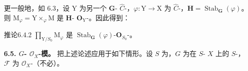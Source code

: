 更一般地，如 6.3，设 $\mathrm Y$ 为另一个 $\mathbf G$- $\widehat C$-，$\varphi:\mathrm Y\to\mathrm X$ 为 $\widehat C$-，$\mathbf H=\operatorname{Stab}_{\mathbf G}(\varphi)$。则 $\mathrm M_\varphi=\mathrm Y\times_\varphi\mathrm M$ 是 $\mathbf H$- $\mathbf O_{\mathrm Y}$-。因此得到：
\begin{SGAresult}{推论}{6.4.2}
 $\prod_{\mathrm Y/S_0}\mathrm M_\varphi$ 是 $\operatorname{Stab}_{\mathbf G}(\varphi)$-$\mathbf O_{S_0}$-。
\end{SGAresult}

\textbf{6.5. $G$- $\mathcal O_X$-模。} 把上述论述应用于如下情形。设 $S$ 为，$G$ 为在 $S$- $X$ 上的 $S$-，$\mathcal F$ 为 $\mathcal O_X$-（不必）。
